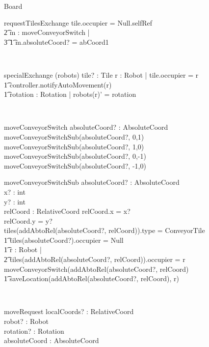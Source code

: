\documentclass[12pt]{article}
\begin{document}
\begin{class}{Board}
\begin{schema}{requestTilesExchange}
tile.occupier \not = Null.selfRef \\ \t2
\THEN \exists m : moveConveyorSwitch | \\ \t3 \t1 m.absoluteCoord? = abCoord1
\end{schema} \\
\begin{schema}{specialExchange}
\Delta (robots)
tile? : Tile
\where
\exists r : Robot | tile.occupier = r \implies \\ \t1
controller.notifyAutoMovement(r) \\ \t1
\exists rotation : Rotation | robots(r)' = rotation
\end{schema} \\
\begin{schema}{moveConveyorSwitch}
absoluteCoord? : AbsoluteCoord \\
\where
moveConveyorSwitchSub(absoluteCoord?, 0,1) \\
moveConveyorSwitchSub(absoluteCoord?, 1,0) \\
moveConveyorSwitchSub(absoluteCoord?, 0,-1) \\
moveConveyorSwitchSub(absoluteCoord?, -1,0) \\
\end{schema}
\znewpage
\begin{schema}{moveConveyorSwitchSub}
absoluteCoord? : AbsoluteCoord \\
x? : int \\
y? : int \\
relCoord : RelativeCoord
\where
relCoord.x = x? \\
relCoord.y = y? \\
\IF tiles(addAbtoRel(absoluteCoord?, relCoord)).type = ConveyorTile \\ \t1
tiles(absoluteCoord?).occupier = Null \\ \t1
\exists r : Robot | \\ \t2 tiles(addAbtoRel(absoluteCoord?, relCoord)).occupier = r \\
\THEN moveConveyorSwitch(addAbtoRel(absoluteCoord?, relCoord)\\ \t1
saveLocation(addAbtoRel(absoluteCoord?, relCoord), r)
\end{schema} \\
\begin{schema}{moveRequest}
localCoords? : RelativeCoord \\
robot? : Robot \\
rotation? : Rotation \\
absoluteCoord : AbsoluteCoord \\

\end{schema}
\end{class}
\end{document}
